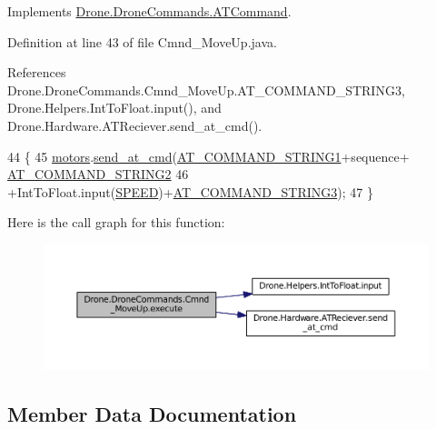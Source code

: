 Implements \hyperlink{interface_drone_1_1_drone_commands_1_1_a_t_command_a5205ae7a2269e1a82923c166322e1374}{Drone.\+Drone\+Commands.\+A\+T\+Command}.



Definition at line 43 of file Cmnd\+\_\+\+Move\+Up.\+java.



References Drone.\+Drone\+Commands.\+Cmnd\+\_\+\+Move\+Up.\+A\+T\+\_\+\+C\+O\+M\+M\+A\+N\+D\+\_\+\+S\+T\+R\+I\+N\+G3, Drone.\+Helpers.\+Int\+To\+Float.\+input(), and Drone.\+Hardware.\+A\+T\+Reciever.\+send\+\_\+at\+\_\+cmd().


\begin{DoxyCode}
44     \{
45         \hyperlink{class_drone_1_1_drone_commands_1_1_cmnd___move_up_aaef759c5762f10ff3de1072e24ce1b71}{motors}.\hyperlink{class_drone_1_1_hardware_1_1_a_t_reciever_a93352d75209626cf62bde294b35f9120}{send\_at\_cmd}(\hyperlink{class_drone_1_1_drone_commands_1_1_cmnd___move_up_a72aac8e499e474b70b46db3f90b094dc}{AT\_COMMAND\_STRING1}+sequence+
      \hyperlink{class_drone_1_1_drone_commands_1_1_cmnd___move_up_a662258129137e91eb02e4620e9044ece}{AT\_COMMAND\_STRING2}
46                             +IntToFloat.input(\hyperlink{class_drone_1_1_drone_commands_1_1_cmnd___move_up_ad13629ea9d3d529c885bb532f8eb999f}{SPEED})+\hyperlink{class_drone_1_1_drone_commands_1_1_cmnd___move_up_ae04f16b0fcbe1ba267bccca616e6bef1}{AT\_COMMAND\_STRING3});
47     \}
\end{DoxyCode}


Here is the call graph for this function\+:\nopagebreak
\begin{figure}[H]
\begin{center}
\leavevmode
\includegraphics[width=350pt]{class_drone_1_1_drone_commands_1_1_cmnd___move_up_acd81d9358005473be57b6bb615848bd4_cgraph}
\end{center}
\end{figure}




\subsection{Member Data Documentation}
\hypertarget{class_drone_1_1_drone_commands_1_1_cmnd___move_up_a72aac8e499e474b70b46db3f90b094dc}{}
